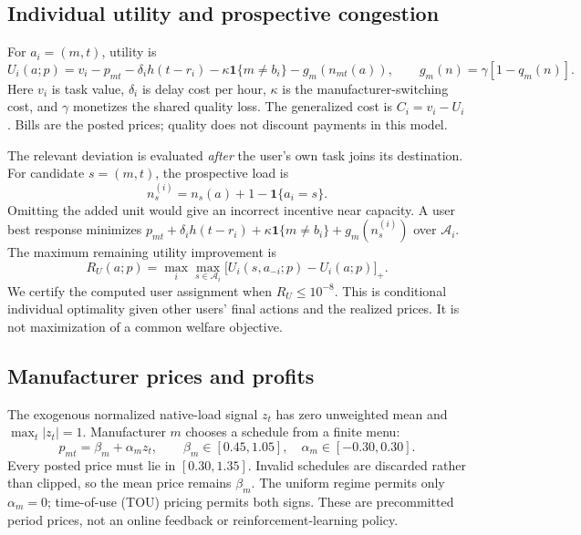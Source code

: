 \documentclass[11pt,a4paper]{article}
\newcommand{\Aset}{\mathcal{A}}
\begin{document}
\subsection{Individual utility and prospective congestion}
For $a_i=(m,t)$, utility is
\begin{equation}
 U_i(a;p)=v_i-p_{mt}-\delta_i h(t-r_i)-\kappa\mathbf{1}\{m\ne b_i\}
          -g_m(n_{mt}(a)),\qquad g_m(n)=\gamma[1-q_m(n)].
 \label{eq:utility}
\end{equation}
Here $v_i$ is task value, $\delta_i$ is delay cost per hour, $\kappa$ is the manufacturer-switching cost, and $\gamma$ monetizes the shared quality loss. The generalized cost is $C_i=v_i-U_i$. Bills are the posted prices; quality does not discount payments in this model.

The relevant deviation is evaluated \emph{after} the user's own task joins its destination. For candidate $s=(m,t)$, the prospective load is
\begin{equation}
 n_s^{(i)}=n_s(a)+1-\mathbf{1}\{a_i=s\}.
 \label{eq:ownload}
\end{equation}
Omitting the added unit would give an incorrect incentive near capacity. A user best response minimizes $p_{mt}+\delta_i h(t-r_i)+\kappa\mathbf{1}\{m\ne b_i\}+g_m(n_s^{(i)})$ over $\Aset_i$. The maximum remaining utility improvement is
\begin{equation}
 R_U(a;p)=\max_i\max_{s\in\Aset_i}\big[U_i(s,a_{-i};p)-U_i(a;p)\big]_+.
 \label{eq:userregret}
\end{equation}
We certify the computed user assignment when $R_U\leq10^{-8}$. This is conditional individual optimality given other users' final actions and the realized prices. It is not maximization of a common welfare objective.

\subsection{Manufacturer prices and profits}
The exogenous normalized native-load signal $z_t$ has zero unweighted mean and $\max_t|z_t|=1$. Manufacturer $m$ chooses a schedule from a finite menu:
\begin{equation}
 p_{mt}=\beta_m+\alpha_m z_t,\qquad
 \beta_m\in[0.45,1.05],\quad \alpha_m\in[-0.30,0.30].
 \label{eq:tariff}
\end{equation}
Every posted price must lie in $[0.30,1.35]$. Invalid schedules are discarded rather than clipped, so the mean price remains $\beta_m$. The uniform regime permits only $\alpha_m=0$; time-of-use (TOU) pricing permits both signs. These are precommitted period prices, not an online feedback or reinforcement-learning policy.
\end{document}

